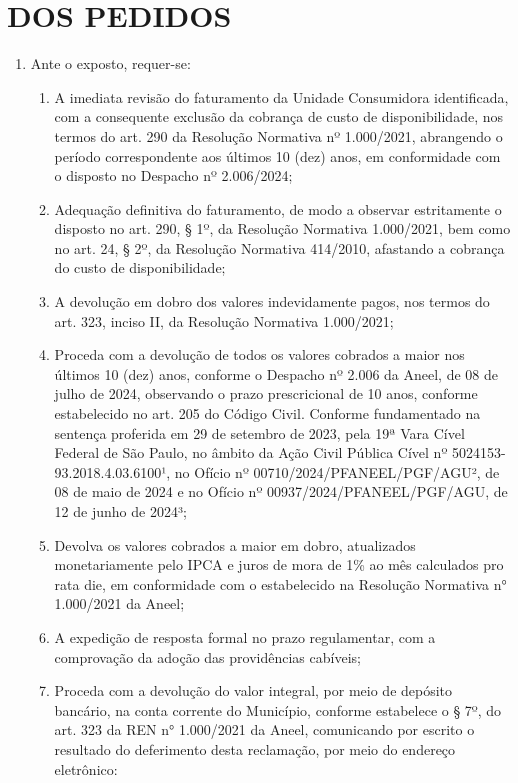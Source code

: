 \section{DOS PEDIDOS}

\begin{enumerate}[resume]
\item Ante o exposto, requer-se:
    \begin{enumerate}
    \item A imediata revisão do faturamento da Unidade Consumidora identificada, com a consequente exclusão da cobrança de custo de disponibilidade, nos termos do art. 290 da Resolução Normativa nº 1.000/2021, abrangendo o período correspondente aos últimos 10 (dez) anos, em conformidade com o disposto no Despacho nº 2.006/2024;
    \item Adequação definitiva do faturamento, de modo a observar estritamente o disposto no art. 290, § 1º, da Resolução Normativa 1.000/2021, bem como no art. 24, § 2º, da Resolução Normativa 414/2010, afastando a cobrança do custo de disponibilidade;
    \item A devolução em dobro dos valores indevidamente pagos, nos termos do art. 323, inciso II, da Resolução Normativa 1.000/2021;
    \item Proceda com a devolução de todos os valores cobrados a maior nos últimos 10 (dez) anos, conforme o Despacho nº 2.006 da Aneel, de 08 de julho de 2024, observando o prazo prescricional de 10 anos, conforme estabelecido no art. 205 do Código Civil. Conforme fundamentado na sentença proferida em 29 de setembro de 2023, pela 19ª Vara Cível Federal de São Paulo, no âmbito da Ação Civil Pública Cível nº 5024153- 93.2018.4.03.6100¹, no Ofício nº 00710/2024/PFANEEL/PGF/AGU², de 08 de maio de 2024 e no Ofício nº 00937/2024/PFANEEL/PGF/AGU, de 12 de junho de 2024³;
    \item Devolva os valores cobrados a maior em dobro, atualizados monetariamente pelo IPCA e juros de mora de 1\% ao mês calculados pro rata die, em conformidade com o estabelecido na Resolução Normativa n° 1.000/2021 da Aneel;
    \item A expedição de resposta formal no prazo regulamentar, com a comprovação da adoção das providências cabíveis;
    \item Proceda com a devolução do valor integral, por meio de depósito bancário, na conta corrente do Município, conforme estabelece o § 7º, do art. 323 da REN n° 1.000/2021 da Aneel, comunicando por escrito o resultado do deferimento desta reclamação, por meio do endereço eletrônico: \emailEmpresa{}
    \end{enumerate}
\end{enumerate}